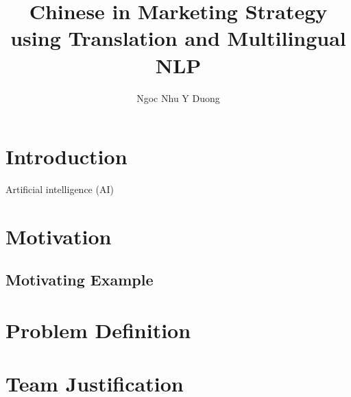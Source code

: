 \documentclass[sigconf]{acmart}
\begin{document}
\title{Chinese in Marketing Strategy using Translation and Multilingual NLP}
\author{Ngoc Nhu Y Duong}

\begin{abstract}

\end{abstract}

\maketitle

\section{Introduction}
Artificial intelligence (AI)

\section{Motivation}

\subsection{Motivating Example}

\section{Problem Definition}

\section{Team Justification} 
\end{document}
